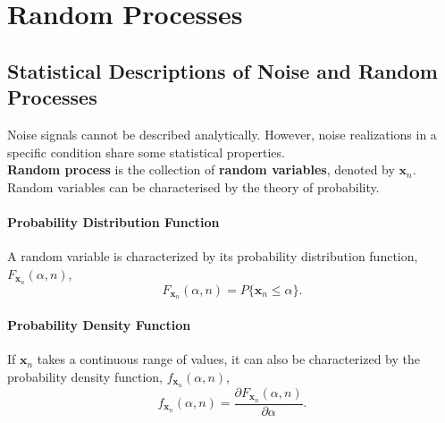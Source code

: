\section{Random Processes}
\subsection{Statistical Descriptions of Noise and Random Processes}
Noise signals cannot be described analytically. However, noise realizations in a specific condition share some statistical properties. \\

\textbf{Random process} is the collection of \textbf{random variables}, denoted by $\mathbf{x}_n$. Random variables can be characterised by the theory of probability.

\paragraph{Probability Distribution Function} A random variable is characterized by its probability distribution function, $F_{\mathbf{x}_n}(\alpha, n)$,
\[
    F_{\mathbf{x}_n}(\alpha, n) = P\{\mathbf{x}_n\leq \alpha\}.
\]
\paragraph{Probability Density Function} If $\mathbf{x}_{n}$ takes a continuous range of values, it can also be characterized by the probability density function, $f_{\mathbf{x}_n}(\alpha, n)$,
\[
    f_{\mathbf{x}_n}(\alpha, n) = \frac{\partial F_{\mathbf{x}_n}(\alpha, n)}{\partial \alpha}.
\]
